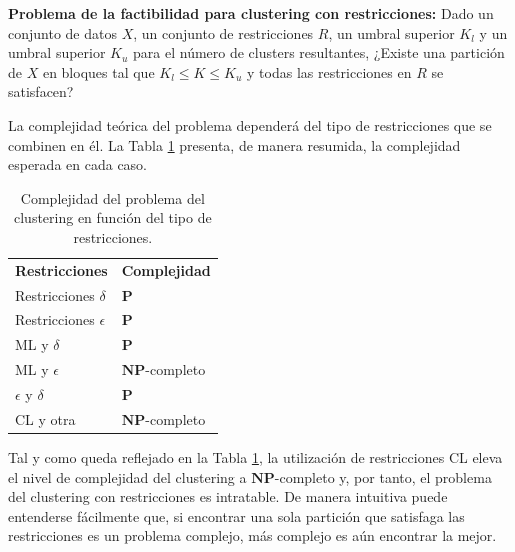 \begin{definicion}
	
	\textbf{Problema de la factibilidad para clustering con restricciones:} Dado un conjunto de datos $X$, un conjunto de restricciones $R$, un umbral superior $K_l$ y un umbral superior $K_u$ para el número de clusters resultantes, ¿Existe una partición de $X$ en bloques tal que $K_l \le K \le K_u$ y todas las restricciones en $R$ se satisfacen? \cite{davidson2005clustering} \cite{davidson2007survey}
	
\end{definicion}

La complejidad teórica del problema dependerá del tipo de restricciones que se combinen en él. La Tabla \ref{tab:tabla1} presenta, de manera resumida, la complejidad esperada en cada caso. 

\begin{table}[h]
	\centering
	\setlength{\arrayrulewidth}{1mm}
	\setlength{\tabcolsep}{10pt}
	\renewcommand{\arraystretch}{1}
	
	\begin{tabular}{ >{\centering\arraybackslash}m{4cm}  >{\centering\arraybackslash}m{4cm} }
		\hline
		\rowcolor{black}
		\multicolumn{2}{c}{\bf \color{white}{Complejidad del clustering con restricciones}}\\
		\hline
		\rowcolor{gray!50}
		\textbf{Restricciones} & \textbf{Complejidad} \\
		Restricciones $\delta$ & $\mathbf{P}$ \\
		Restricciones $\epsilon$ & $\mathbf{P}$ \\
		\acs{ML} y $\delta$ & $\mathbf{P}$ \\
		\acs{ML} y $\epsilon$ & $\mathbf{NP}$-completo \\
		$\epsilon$ y $\delta$ & $\mathbf{P}$ \\
		\acs{CL} y otra & $\mathbf{NP}$-completo \\
		\hline
		
	\end{tabular}
	\caption[Complejidad del problema del clustering en función del tipo de restricciones]{Complejidad del problema del clustering en función del tipo de restricciones. \cite{davidson2007survey}}
	\label{tab:tabla1}
\end{table}

Tal y como queda reflejado en la Tabla \ref{tab:tabla1}, la utilización de restricciones \acf{CL} eleva el nivel de complejidad del clustering a $\mathbf{NP}$-completo y, por tanto, el problema del clustering con restricciones es intratable. De manera intuitiva puede entenderse fácilmente que, si encontrar una sola partición que satisfaga las restricciones es un problema complejo, más complejo es aún encontrar la mejor. 


